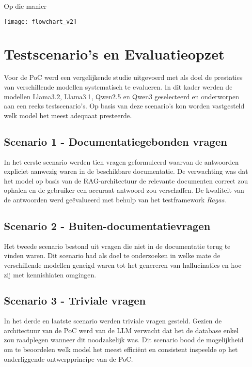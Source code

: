 \documentclass[a0,portrait]{hogent-poster}
\begin{document}
\begin{multicols}{2}
Op die manier 

\begin{center}
    \captionsetup{type=figure}
    \texttt{[image: flowchart\_v2]}
    \label{fig:PoC_RAG}
\end{center}

\section{Testscenario’s en Evaluatieopzet}

Voor de PoC werd een vergelijkende studie uitgevoerd met als doel de prestaties van verschillende modellen systematisch te evalueren. In dit kader werden de modellen Llama3.2, Llama3.1, Qwen2.5 en Qwen3 geselecteerd en onderworpen aan een reeks testscenario’s. Op basis van deze scenario’s kon worden vastgesteld welk model het meest adequaat presteerde.

\subsection*{Scenario 1 - Documentatiegebonden vragen}
In het eerste scenario werden tien vragen geformuleerd waarvan de antwoorden expliciet aanwezig waren in de beschikbare documentatie. De verwachting was dat het model op basis van de RAG-architectuur de relevante documenten correct zou ophalen en de gebruiker een accuraat antwoord zou verschaffen. De kwaliteit van de antwoorden werd geëvalueerd met behulp van het testframework \textit{Ragas}.  

\subsection*{Scenario 2 - Buiten-documentatievragen}
Het tweede scenario bestond uit vragen die niet in de documentatie terug te vinden waren. Dit scenario had als doel te onderzoeken in welke mate de verschillende modellen geneigd waren tot het genereren van hallucinaties en hoe zij met kennishiaten omgingen.  

\subsection*{Scenario 3 - Triviale vragen}
In het derde en laatste scenario werden triviale vragen gesteld. Gezien de architectuur van de PoC werd van de LLM verwacht dat het de database enkel zou raadplegen wanneer dit noodzakelijk was. Dit scenario bood de mogelijkheid om te beoordelen welk model het meest efficiënt en consistent inspeelde op het onderliggende ontwerpprincipe van de PoC.  


\end{multicols}
\end{document}
